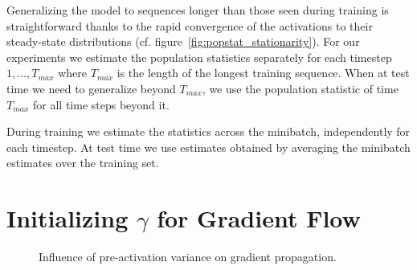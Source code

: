\documentclass{article} %
\begin{document}
Generalizing the model to sequences longer than those seen during training
is straightforward thanks to the rapid convergence of the activations
to their steady-state distributions (cf. figure~\ref{fig:popstat_stationarity}).
For our experiments we estimate the population statistics separately for each timestep $1, \ldots, T_{max}$ where $T_{max}$ is the length of the longest training sequence.
When at test time we need to generalize beyond $T_{max}$, we use the population statistic of time $T_{max}$ for all time steps beyond it.

During training we estimate the statistics across the minibatch, independently for each timestep.
At test time we use estimates obtained by averaging the minibatch estimates over the training set.




\section{Initializing $\gamma$ for Gradient Flow}
\label{sec:activation-variance}

\begin{figure}[!ht]
  \center%
  \hspace{2mm}%
  \caption{
Influence of pre-activation variance on gradient propagation.
}
  \label{fig:variance}
\end{figure}
\end{document}
